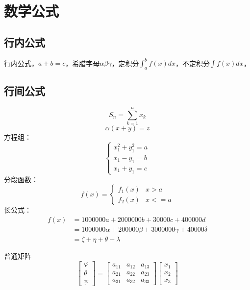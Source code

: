 \documentclass[a4paper,AutoFakeBold={2.7},UTF8,zihao=5,twoside]{ctexart} %
\numberwithin{equation}{section}%
\theoremstyle{definition}%
\begin{document}
\clearpage

\section{数学公式}
\subsection{行内公式}
行内公式，$a+b=c$，希腊字母$\alpha\beta\gamma$，定积分$\int_{a}^{b} f(x)dx$，不定积分$\int f(x)dx$，
\subsection{行间公式}
\begin{equation}
    S_{n}=\sum_{k=1}^{n} x_{k} \label{(1)}
\end{equation}
\begin{equation}
    \alpha\left( x+y\right) =z
\end{equation}
方程组：
\begin{equation}
    \begin{cases}
        x_{1}^{2}+y_{1}^2=a \\
        x_{1}-y_{1}=b       \\
        x_{1}+y_{1}=c
    \end{cases}
\end{equation}
分段函数：
\begin{equation}
    f(x)=
    \begin{cases}
        f_{1}(x) & x>a  \\
        f_{2}(x) & x<=a
    \end{cases}
\end{equation}
长公式：
\begin{equation}
    \begin{split}
        f(x) & =1000000a+2000000b+30000c+400000d                    \\
             & =1000000\alpha+200000\beta+3000000\gamma+40000\delta \\
             & =\zeta+\eta+\theta+\lambda
    \end{split}
\end{equation}

普通矩阵
\begin{equation}
    \begin{bmatrix}
        \varphi \\
        \theta  \\
        \psi
    \end{bmatrix}
    =
    \begin{bmatrix}
        a_{11} & a_{12} & a_{13} \\
        a_{21} & a_{22} & a_{23} \\
        a_{31} & a_{32} & a_{33}
    \end{bmatrix}
    \begin{bmatrix}
        x_{1} \\
        x_{2} \\
        x_{3}
    \end{bmatrix}
\end{equation}
\end{document}
